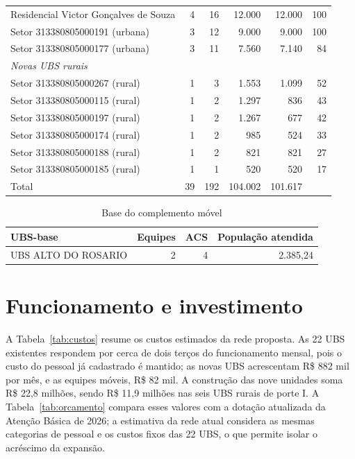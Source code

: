 \begin{longtable}{p{.42\linewidth}rrrrr}
Residencial Victor Gonçalves de Souza & 4 & 16 & 12.000 & 12.000 & 100\\
Setor 313380805000191 (urbana) & 3 & 12 & 9.000 & 9.000 & 100\\
Setor 313380805000177 (urbana) & 3 & 11 & 7.560 & 7.140 & 84\\
\midrule
\multicolumn{6}{l}{\textit{Novas UBS rurais}}\\
Setor 313380805000267 (rural) & 1 & 3 & 1.553 & 1.099 & 52\\
Setor 313380805000115 (rural) & 1 & 2 & 1.297 & 836 & 43\\
Setor 313380805000197 (rural) & 1 & 2 & 1.267 & 677 & 42\\
Setor 313380805000174 (rural) & 1 & 2 & 985 & 524 & 33\\
Setor 313380805000188 (rural) & 1 & 2 & 821 & 821 & 27\\
Setor 313380805000185 (rural) & 1 & 1 & 520 & 520 & 17\\
\midrule
Total & 39 & 192 & 104.002 & 101.617 & \\
\bottomrule\end{longtable}\endgroup
{}

\begin{table}[htbp]\centering
\caption{Base do complemento móvel}\label{tab:movel}
\begin{tabular}{lrrr}\toprule UBS-base & Equipes & ACS & População atendida\\\midrule
UBS ALTO DO ROSARIO & 2 & 4 & 2.385,24\\
\bottomrule\end{tabular}
\end{table}

\section{Funcionamento e investimento}

A Tabela~\ref{tab:custos} resume os custos estimados da rede proposta. As 22 UBS existentes respondem
por cerca de dois terços do funcionamento mensal, pois o custo do pessoal já cadastrado é mantido; as
novas UBS acrescentam R\$ 882 mil por mês, e as equipes móveis, R\$ 82 mil. A construção das nove
unidades soma R\$ 22,8 milhões, sendo R\$ 11,9 milhões nas seis UBS rurais de porte I. A Tabela~\ref{tab:orcamento} compara esses valores
com a dotação atualizada da Atenção Básica de 2026; a estimativa da rede atual considera as mesmas
categorias de pessoal e os custos fixos das 22 UBS, o que permite isolar o acréscimo da expansão.

